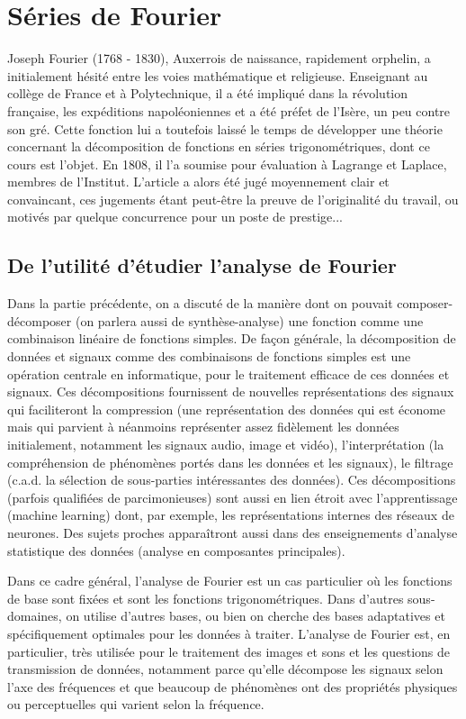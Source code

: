 

\chapter{Séries de Fourier}

Joseph Fourier (1768 - 1830), Auxerrois de naissance, rapidement
orphelin, a initialement hésité entre les voies mathématique et
religieuse. Enseignant au collège de France et à Polytechnique, il a
été impliqué dans la révolution française, les expéditions
napoléoniennes et a été préfet de l'Isère, un peu contre son
gré. Cette fonction lui a toutefois laissé le temps de développer une
théorie concernant la décomposition de fonctions en séries
trigonométriques, dont ce cours est l'objet. En  1808, il l'a soumise
pour évaluation à Lagrange et Laplace, membres de l'Institut. L'article a alors été jugé moyennement clair et convaincant, ces jugements étant peut-être la preuve de l'originalité du travail, ou motivés par quelque concurrence pour un poste de prestige...

\section{De l'utilité d'étudier l'analyse de Fourier}

Dans la partie précédente, on a discuté de la manière dont on pouvait composer-décomposer (on parlera aussi de synthèse-analyse) une fonction  comme une combinaison linéaire de fonctions simples. De façon générale, la décomposition de données et signaux comme des combinaisons de fonctions simples est une opération centrale en informatique, pour le traitement efficace de ces données et signaux. Ces décompositions fournissent de nouvelles représentations des signaux qui faciliteront la compression (une représentation des données qui est économe mais qui parvient à néanmoins représenter assez fidèlement les données initialement, notamment les signaux audio, image et vidéo), l'interprétation (la compréhension de phénomènes portés dans les données et les signaux), le filtrage (c.a.d. la sélection de sous-parties intéressantes des données). Ces décompositions (parfois qualifiées de parcimonieuses) sont aussi en lien étroit avec l'apprentissage (machine learning) dont, par exemple, les représentations internes des réseaux de neurones. Des sujets proches apparaîtront aussi dans des enseignements d'analyse statistique des données (analyse en composantes principales).

Dans ce cadre général, l'analyse de Fourier est un cas particulier où les fonctions de base sont fixées et sont les fonctions trigonométriques. Dans d'autres sous-domaines, on utilise d'autres bases, ou bien on cherche des bases adaptatives et spécifiquement optimales pour les données à traiter. L'analyse de Fourier est, en particulier, très utilisée pour le traitement des images et sons et les questions de transmission de données, notamment parce qu'elle décompose les signaux selon l'axe des fréquences et que beaucoup de phénomènes ont des propriétés physiques ou perceptuelles qui varient selon la fréquence.


